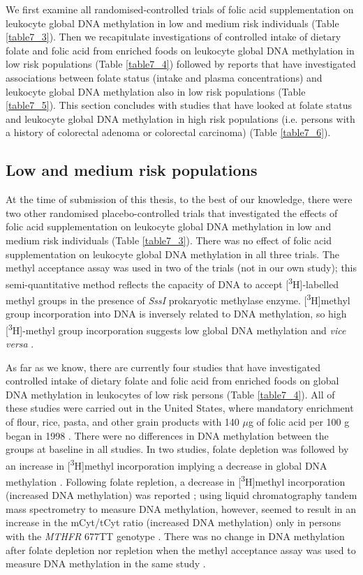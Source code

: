 \noindent We first examine all randomised-controlled trials of folic acid supplementation on leukocyte global DNA methylation in low and medium risk individuals (Table \ref{table7_3}). Then we recapitulate investigations of controlled intake of dietary folate and folic acid from enriched foods on leukocyte global DNA methylation in low risk populations (Table \ref{table7_4}) followed by reports that have investigated associations between folate status (intake and plasma concentrations) and leukocyte global DNA methylation also in low risk populations (Table \ref{table7_5}). This section concludes with studies that have looked at folate status and leukocyte global DNA methylation in high risk populations (i.e. persons with a history of colorectal adenoma or colorectal carcinoma) (Table \ref{table7_6}).

\subsection{Low and medium risk populations} %
\noindent At the time of submission of this thesis, to the best of our knowledge, there were two other randomised placebo-controlled trials that investigated the effects of folic acid supplementation on leukocyte global DNA methylation in low and medium risk individuals (Table \ref{table7_3}). There was no effect of folic acid supplementation on leukocyte global DNA methylation in all three trials. The methyl acceptance assay was used in two of the trials (not in our own study); this semi-quantitative method reflects the capacity of DNA to accept [\textsuperscript{3}H]-labelled methyl groups in the presence of \emph{SssI} prokaryotic methylase enzyme. [\textsuperscript{3}H]methyl group incorporation into DNA is inversely related to DNA methylation, so high [\textsuperscript{3}H]-methyl group incorporation suggests low global DNA methylation and \emph{vice versa} \cite{c71}.

\noindent As far as we know, there are currently four studies that have investigated controlled intake of dietary folate and folic acid from enriched foods on global DNA methylation in leukocytes of low risk persons (Table \ref{table7_4}). All of these studies were carried out in the United States, where mandatory enrichment of flour, rice, pasta, and other grain products with 140 $\mu$g of folic acid per 100 g began in 1998 \cite{c72}. There were no differences in DNA methylation between the groups at baseline in all studies. In two studies, folate depletion was followed by an increase in [\textsuperscript{3}H]methyl incorporation implying a decrease in global DNA methylation \cite{c73,c74}. Following folate repletion, a decrease in [\textsuperscript{3}H]methyl incorporation (increased DNA methylation) was reported \cite{c73}; using liquid chromatography tandem mass spectrometry to measure DNA methylation, however, seemed to result in an increase in the mCyt/tCyt ratio (increased DNA methylation) only in persons with the \emph{MTHFR} 677TT genotype \cite{c75}. There was no change in DNA methylation after folate depletion nor repletion when the methyl acceptance assay was used to measure DNA methylation in the same study \cite{c75}. 
 
